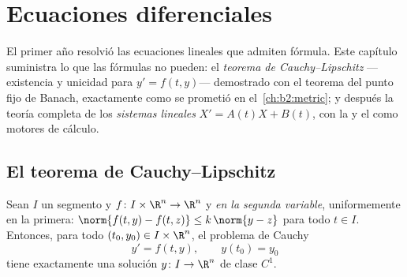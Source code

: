 \chapter{Ecuaciones diferenciales}\label{ch:b2:diffeq}

El primer año resolvió las ecuaciones lineales que admiten fórmula.
Este capítulo suministra lo que las fórmulas no pueden: el \emph{teorema
de Cauchy--Lipschitz} ---existencia y unicidad para $y' = f(t, y)$---
demostrado con el teorema del punto fijo de Banach, exactamente como se
prometió en el~\cref{ch:b2:metric}; y después la teoría completa de los
\emph{sistemas lineales} $X' = A(t)X + B(t)$, con la
 y el  como motores de cálculo.

\section{El teorema de Cauchy--Lipschitz}

\begin{theorem}\label{thm:b2:diffeq:cauchylipschitz}
Sean $I$ un segmento y $f \colon I \times \R^n \to \R^n$  y
\emph{ en la segunda variable}, uniformemente en la
primera: $\norm{f(t, y) - f(t, z)} \leq k\,\norm{y - z}$ para todo $t
\in I$. Entonces, para todo $(t_0, y_0) \in I \times \R^n$, el
problema de Cauchy
\[
y' = f(t, y), \qquad y(t_0) = y_0
\]
tiene exactamente una solución $y \colon I \to \R^n$ de clase $C^1$.
\end{theorem}

